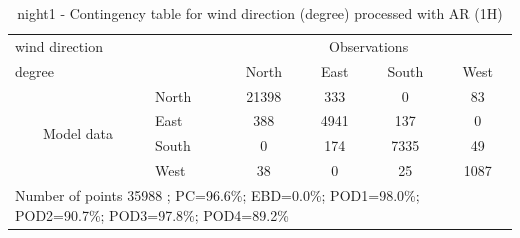 \begin{table}[p!]
\begin{center}
\begin{tabular}{llcccc}
\hline
{wind direction}                                       &                                                    & \multicolumn{4}{c}{Observations}                 \\
{degree}                                       &                             & {North}   & {East} & {South} & {West} \\
\hline
\multicolumn{1}{c}{\multirow{4}{*}{Model data}}  & {North}              & 21398                & 333                       & 0              & 83\\
                                                 & {East}               & 388                & 4941                       & 137              & 0\\
                                                 & {South}              & 0                & 174                      & 7335             & 49\\
                                                 & {West}               & 38               & 0                      & 25             & 1087\\
\hline 
\multicolumn{6}{l}{ Number of points        35988 ; PC=96.6\%; EBD=0.0\%; POD1=98.0\%; POD2=90.7\%; POD3=97.8\%; POD4=89.2\%}                 \\
\end{tabular}
\end{center}
\caption{night1 - Contingency table for {wind direction} (degree) processed with AR (1H)}
\label{tab:contingencywdAFT:night1}
\end{table}
